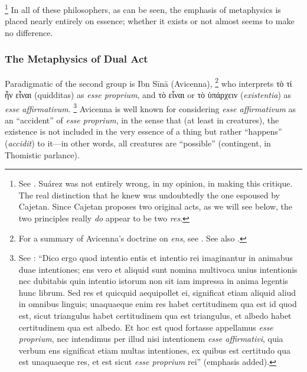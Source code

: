 %
\footnote{See \cite[148–149]{gilson:letre}. Suárez was not entirely wrong, in my opinion, in making this critique. The real distinction that he knew was undoubtedly the one espoused by Cajetan. Since Cajetan proposes two original acts, as we will see below, the two principles really \emph{do} appear to be two \emph{res}.} In all of these philosophers, as can be seen, the emphasis of metaphysics is placed nearly entirely on essence; whether it exists or not almost seems to make no difference.

\subsubsection{The Metaphysics of Dual Act}

Paradigmatic of the second group is Ibn Sīnā (Avicenna),%
%
\footnote{For a summary of Avicenna’s doctrine on \emph{ens}, see \cite[124–132]{gilson:letre}. See also \cite[375–376]{contat:etant}.}
%
who interprets τὸ τί ἦν εἶναι (quidditas) as \emph{esse proprium}, and τὸ εἶναι or τὸ ὑπάρχειν (\emph{existentia}) as \emph{esse affirmativum}.%
%
\footnote{See \cite[Tract.~I, sec.~5, {[31]}, 34-35]{avicenna:metaphysics}: “Dico ergo quod intentio entis et intentio rei imaginantur in animabus duae intentiones; ens vero et aliquid sunt nomina multivoca unius intentionis nec dubitabis quin intentio istorum non sit iam impressa in anima legentis hunc librum. Sed res et quicquid aequipollet ei, significat etiam aliquid aliud in omnibus linguis; unaquaeque enim res habet certitudinem qua est id quod est, sicut triangulus habet certitudinem qua est triangulus, et albedo habet certitudinem qua est albedo. Et hoc est quod fortasse appellamus \emph{esse proprium}, nec intendimus per illud nisi intentionem \emph{esse affirmativi}, quia verbum ens significat etiam multas intentiones, ex quibus est certitudo qua est unaquaeque res, et est sicut \emph{esse proprium} rei” (emphasis added).} Avicenna is well known for considering \emph{esse affirmativum} as an “accident” of \emph{esse proprium}, in the sense that (at least in creatures), the existence is not included in the very essence of a thing but rather “happens” (\emph{accidit}) to it—in other words, all creatures are “possible” (contingent, in Thomistic parlance).%
%
